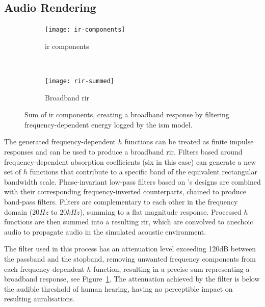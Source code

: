 \subsection{Audio Rendering}
\begin{figure}[htbp]
    \centering
    \begin{subfigure}[t]{0.49\textwidth}
        \centering
        \texttt{[image: ir-components]}
        \caption{\acrshort{ir} components}
    \end{subfigure}%
    ~ 
    \begin{subfigure}[t]{0.49\textwidth}
        \centering
        \texttt{[image: rir-summed]}
        \caption{Broadband \acrshort{rir}}
    \end{subfigure}
    \caption[ISM Acoustic Rendering --- Broadband IR generation]{Sum of \acrshort{ir} components, creating a broadband response by filtering frequency-dependent energy logged by the \acrshort{ism} model.}\label{fig:ism-ir-sum}
\end{figure}
The generated frequency-dependent $h$ functions can be treated as finite impulse responses and can be used to produce a broadband \acrshort{rir}. Filters based around frequency-dependent absorption coefficients (six in this case) can generate a new set of $h$ functions that contribute to a specific band of the equivalent rectangular bandwidth scale. Phase-invariant low-pass filters based on \citep{smith1997scientist}'s designs are combined with their corresponding frequency-inverted counterparts, chained to produce band-pass filters. Filters are complementary to each other in the frequency domain ($20Hz$ to $20kHz$), summing to a flat magnitude response. Processed $h$ functions are then summed into a resulting \acrshort{rir}, which are convolved to anechoic audio to propagate audio in the simulated acoustic environment. \par
The filter used in this process has an attenuation level exceeding 120dB between the passband and the stopband, removing unwanted frequency components from each frequency-dependent $h$ function, resulting in a precise sum representing a broadband response, see Figure~\ref{fig:ism-ir-sum}. The attenuation achieved by the filter is below the audible threshold of human hearing, having no perceptible impact on resulting auralisations.


